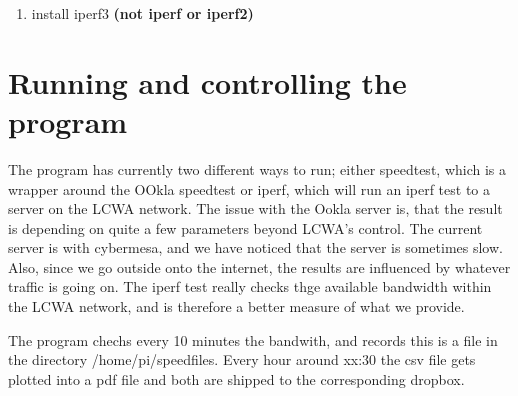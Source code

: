 \documentclass[12pt]{article}
\begin{document}
\begin{enumerate}
\item install iperf3 \textbf{(not iperf or iperf2)}
\end{enumerate}



\section{Running and controlling the program}

The program has currently two different ways to run; either speedtest, which is a wrapper around the OOkla speedtest  or iperf, which will run an iperf test to a server on the LCWA network. The issue with the Ookla server is, that the result is depending on quite a few parameters beyond LCWA's control. The current server is with cybermesa,
and we have noticed that the server is sometimes slow. Also, since we go outside onto the internet, the results are  influenced by whatever traffic is going on. The iperf test really checks thge available bandwidth within the LCWA network, and is therefore a better measure of what we provide.

The program chechs every 10 minutes the bandwith, and records this is a file in the directory /home/pi/speedfiles. Every hour around xx:30 the csv file gets plotted into a pdf file and both are shipped to the corresponding dropbox.






\end{document}

